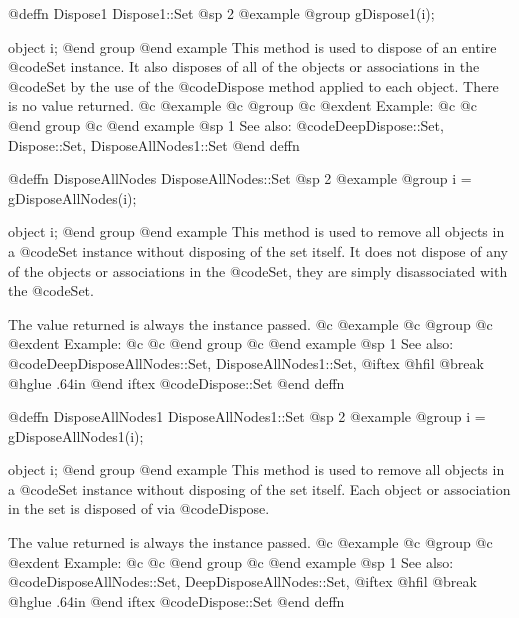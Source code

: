 @deffn {Dispose1} Dispose1::Set
@sp 2
@example
@group
gDispose1(i);

object  i;
@end group
@end example
This method is used to dispose of an entire @code{Set} instance.  It also
disposes of all of the objects or associations in the @code{Set} by the use of
the @code{Dispose} method applied to each object.  There is no value
returned.
@c @example
@c @group
@c @exdent Example:
@c 
@c @end group
@c @end example
@sp 1
See also:  @code{DeepDispose::Set, Dispose::Set, DisposeAllNodes1::Set}
@end deffn















@deffn {DisposeAllNodes} DisposeAllNodes::Set
@sp 2
@example
@group
i = gDisposeAllNodes(i);

object  i;
@end group
@end example
This method is used to remove all objects in a @code{Set} instance
without disposing of the set itself.  It does not dispose of any of the
objects or associations in the @code{Set}, they are simply
disassociated with the @code{Set}.

The value returned is always the instance passed.
@c @example
@c @group
@c @exdent Example:
@c 
@c @end group
@c @end example
@sp 1
See also:  @code{DeepDisposeAllNodes::Set, DisposeAllNodes1::Set,}
@iftex
@hfil @break @hglue .64in      
@end iftex
@code{Dispose::Set}
@end deffn


















@deffn {DisposeAllNodes1} DisposeAllNodes1::Set
@sp 2
@example
@group
i = gDisposeAllNodes1(i);

object  i;
@end group
@end example
This method is used to remove all objects in a @code{Set} instance
without disposing of the set itself.  Each object or association in the
set is disposed of via @code{Dispose}.

The value returned is always the instance passed.
@c @example
@c @group
@c @exdent Example:
@c 
@c @end group
@c @end example
@sp 1
See also:  @code{DisposeAllNodes::Set, DeepDisposeAllNodes::Set,}
@iftex
@hfil @break @hglue .64in      
@end iftex
@code{Dispose::Set}
@end deffn














